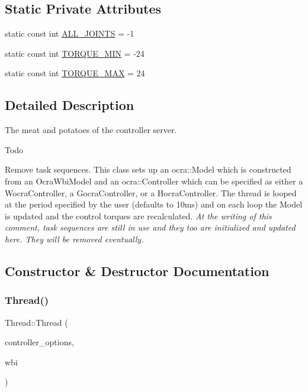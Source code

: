 \subsection*{Static Private Attributes}
\begin{DoxyCompactItemize}
\item 
static const int \hyperlink{classThread_a875b3311a39e3b87dbc981f2db7b1b9d}{A\+L\+L\+\_\+\+J\+O\+I\+N\+TS} = -\/1
\item 
static const int \hyperlink{classThread_ad44e5fbda8070c252ea71823a4b9a6db}{T\+O\+R\+Q\+U\+E\+\_\+\+M\+IN} = -\/24
\item 
static const int \hyperlink{classThread_a5e864394c4bd0fbdf3cba7f6f825e17d}{T\+O\+R\+Q\+U\+E\+\_\+\+M\+AX} = 24
\end{DoxyCompactItemize}


\subsection{Detailed Description}
The meat and potatoes of the controller server. 

\begin{DoxyRefDesc}{Todo}
\item[\hyperlink{todo__todo000001}{Todo}]Remove task sequences. This class sets up an ocra\+::\+Model which is constructed from an Ocra\+Wbi\+Model and an ocra\+::\+Controller which can be specified as either a Wocra\+Controller, a Gocra\+Controller, or a Hocra\+Controller. The thread is looped at the period specified by the user (defaults to 10ms) and on each loop the Model is updated and the control torques are recalculated. {\itshape At the writing of this comment, task sequences are still in use and they too are initialized and updated here. They will be removed eventually.} \end{DoxyRefDesc}


\subsection{Constructor \& Destructor Documentation}
\hypertarget{classThread_a7494a3cf676527432ee724d59ed9ee8f}{}\label{classThread_a7494a3cf676527432ee724d59ed9ee8f} 
\subsubsection{\texorpdfstring{Thread()}{Thread()}}
{\footnotesize\ttfamily Thread\+::\+Thread (\begin{DoxyParamCaption}\item[{\hyperlink{classOcraControllerOptions}{Ocra\+Controller\+Options} \&}]{controller\+\_\+options,  }\item[{std\+::shared\+\_\+ptr$<$ wbi\+::whole\+Body\+Interface $>$}]{wbi }\end{DoxyParamCaption})}

